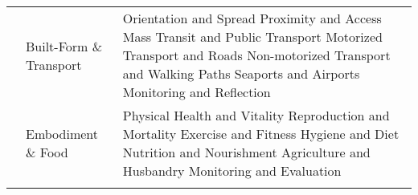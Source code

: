 \begin{table}[th]
\begin{center}
\begin{tabular}{ >{\raggedright\arraybackslash}p{} >{\raggedright\arraybackslash}p{} >{\raggedright\arraybackslash}p{} }
  & Built-Form \& Transport & Orientation and Spread \linebreak Proximity and Access \linebreak Mass Transit and Public Transport \linebreak Motorized Transport and Roads \linebreak Non-motorized Transport and Walking Paths \linebreak Seaports and Airports \linebreak Monitoring and Reflection \linebreak \\
  & Embodiment \& Food & Physical Health and Vitality \linebreak Reproduction and Mortality \linebreak Exercise and Fitness \linebreak Hygiene and Diet \linebreak Nutrition and Nourishment \linebreak Agriculture and Husbandry \linebreak Monitoring and Evaluation \\
\hline
\label{tbl:incomesByUfarmens1}
\end{tabular}
\end{center}
\end{table}


